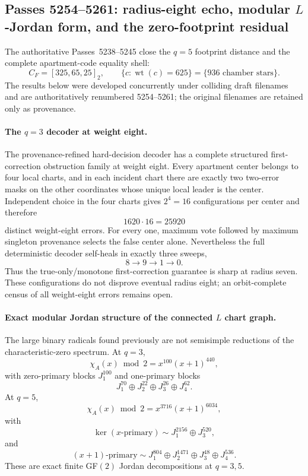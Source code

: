 \ifdefined\WPassFiveTwoFiveFourLoaded\else
\gdef\WPassFiveTwoFiveFourLoaded{1}
\subsection*{Passes 5254--5261: radius-eight echo, modular $L$-Jordan form, and the zero-footprint residual}

The authoritative Passes~5238--5245 close the $q=5$ footprint distance and the complete apartment-code equality shell:
\[
 C_F=[325,65,25]_2,
 \qquad
 \{c:\operatorname{wt}(c)=625\}=\{\text{936 chamber stars}\}.
\]
The results below were developed concurrently under colliding draft filenames and are authoritatively renumbered 5254--5261; the original filenames are retained only as provenance.

\paragraph{The $q=3$ decoder at weight eight.}
The provenance-refined hard-decision decoder has a complete structured first-correction obstruction family at weight eight.  Every apartment center belongs to four local charts, and in each incident chart there are exactly two two-error masks on the other coordinates whose unique local leader is the center.  Independent choice in the four charts gives $2^4=16$ configurations per center and therefore
\[
 1620\cdot16=25920
\]
distinct weight-eight errors.  For every one, maximum vote followed by maximum singleton provenance selects the false center alone.  Nevertheless the full deterministic decoder self-heals in exactly three sweeps,
\[
 8\longrightarrow9\longrightarrow1\longrightarrow0.
\]
Thus the true-only/monotone first-correction guarantee is sharp at radius seven.  These configurations do not disprove eventual radius eight; an orbit-complete census of all weight-eight errors remains open.

\paragraph{Exact modular Jordan structure of the connected $L$ chart graph.}
The large binary radicals found previously are not semisimple reductions of the characteristic-zero spectrum.  At $q=3$,
\[
 \chi_A(x)\bmod2=x^{100}(x+1)^{440},
\]
with zero-primary blocks $J_1^{100}$ and one-primary blocks
\[
 J_1^{70}\oplus J_2^{22}\oplus J_3^{26}\oplus J_4^{62}.
\]
At $q=5$,
\[
 \chi_A(x)\bmod2=x^{3716}(x+1)^{6034},
\]
with
\[
 \ker(x\text{-primary})\sim J_1^{2156}\oplus J_3^{520},
\]
and
\[
 (x+1)\text{-primary}\sim
 J_1^{804}\oplus J_2^{1471}\oplus J_3^{48}\oplus J_4^{536}.
\]
These are exact finite GF$(2)$ Jordan decompositions at $q=3,5$.

